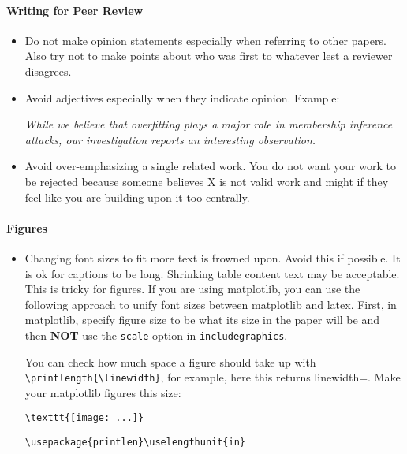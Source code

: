 \paragraph{Writing for Peer Review}
\begin{itemize}
\item{} Do not make opinion statements especially when referring to other papers. Also try not to
  make points about who was first to whatever lest a reviewer disagrees.

\item{} Avoid adjectives especially when they indicate opinion. Example:

  \textit{While we believe that overfitting plays a major role in membership inference attacks, our
    investigation reports an interesting observation.}

\item{} Avoid over-emphasizing a single related work. You do not want your work to be rejected
  because someone believes X is not valid work and might if they feel like you are building
  upon it too centrally.
\end{itemize}

\paragraph{Figures}
\begin{itemize}
  \item{} Changing font sizes to fit more text is frowned upon. Avoid this if possible. It is ok
    for captions to be long. Shrinking table content text may be acceptable. This is tricky for
    figures. If you are using matplotlib, you can use the following approach to unify font sizes
    between matplotlib and latex. First, in matplotlib, specify figure size to be what its size in
    the paper will be and then \textbf{NOT} use the \verb|scale| option in \verb|includegraphics|.

    You can check how much space a figure should take up with \verb|\printlength{\linewidth}|, for
    example, here this returns linewidth=\printlength{\linewidth}. Make your matplotlib figures
    this size:
\begin{verbatim}
\texttt{[image: ...]}
\end{verbatim}

\begin{verbatim}
\usepackage{printlen}\uselengthunit{in}
\end{verbatim}

\end{itemize}

